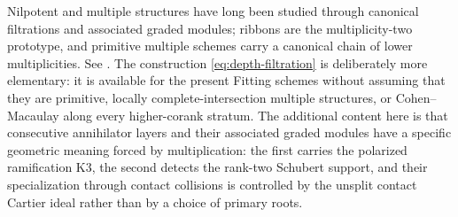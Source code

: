 \begin{remark}
\label{rem:multiple-filtrations}
Nilpotent and multiple structures have long been studied through
canonical filtrations and associated graded modules; ribbons are the
multiplicity-two prototype, and primitive multiple schemes carry a
canonical chain of lower multiplicities. See
\cite{BayerEisenbud,Manolache,Drezet}. The construction
\eqref{eq:depth-filtration} is deliberately more elementary: it is
available for the present Fitting schemes without assuming that they
are primitive, locally complete-intersection multiple structures, or
Cohen--Macaulay along every higher-corank stratum. The additional
content here is that consecutive annihilator layers and their
associated graded modules have a specific geometric meaning forced by
multiplication: the first carries the polarized ramification K3, the
second detects the rank-two Schubert support, and their specialization
through contact collisions is controlled by the unsplit contact
Cartier ideal rather than by a choice of primary roots.
\end{remark}
